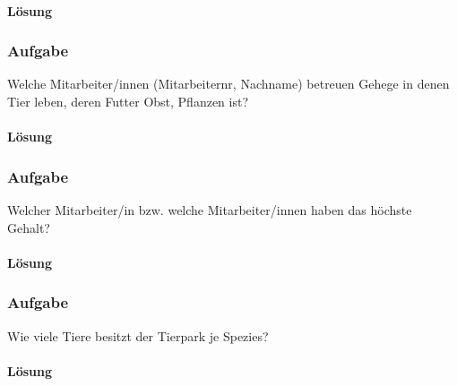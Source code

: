 \paragraph*{Lösung}
\label{sec:uebung_01.aufgabe_10c.loesung}

\subsubsection{Aufgabe}
\label{sec:uebung_01.aufgabe_10d}
Welche Mitarbeiter/innen (Mitarbeiternr, Nachname) betreuen Gehege in denen Tier leben, deren Futter Obst, Pflanzen ist?

\paragraph*{Lösung}
\label{sec:uebung_01.aufgabe_10d.loesung}

\subsubsection{Aufgabe}
\label{sec:uebung_01.aufgabe_10e}
Welcher Mitarbeiter/in bzw. welche Mitarbeiter/innen haben das höchste Gehalt?

\paragraph*{Lösung}
\label{sec:uebung_01.aufgabe_10e.loesung}

\subsubsection{Aufgabe}
\label{sec:uebung_01.aufgabe_10f}
Wie viele Tiere besitzt der Tierpark je Spezies?

\paragraph*{Lösung}
\label{sec:uebung_01.aufgabe_10f.loesung}

